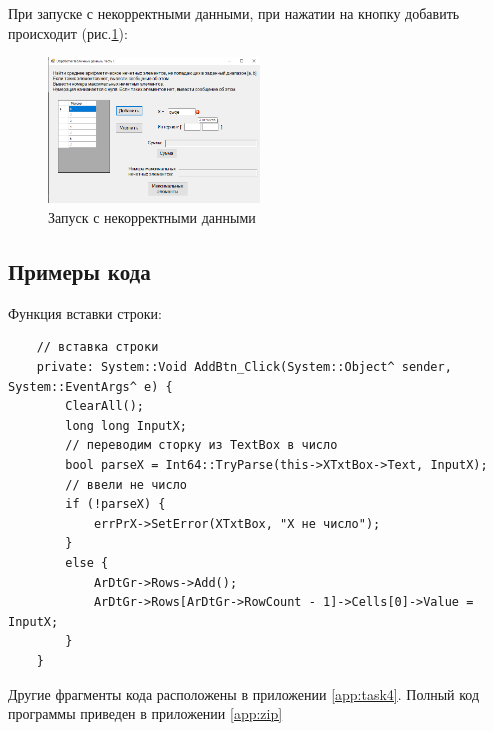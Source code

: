 При запуске с некорректными данными, при нажатии на кнопку добавить происходит  (рис.\ref{fig:BadInputNotIntForm4}):

\begin{figure}[!h]
    \centering
    \includegraphics[width = 0.5\textwidth]{images/Task4/BadInputNotIntX.png}
    \caption{Запуск с некорректными данными}
    \label{fig:BadInputNotIntForm4}
\end{figure}

\subsection{Примеры кода}

Функция вставки строки: 

\begin{verbatim}
	// вставка строки
	private: System::Void AddBtn_Click(System::Object^ sender, System::EventArgs^ e) {
		ClearAll();
		long long InputX;
		// переводим сторку из TextBox в число
		bool parseX = Int64::TryParse(this->XTxtBox->Text, InputX);
		// ввели не число
		if (!parseX) {
			errPrX->SetError(XTxtBox, "X не число");
		}
		else {
			ArDtGr->Rows->Add();
			ArDtGr->Rows[ArDtGr->RowCount - 1]->Cells[0]->Value = InputX;
		}
	}
\end{verbatim}

Другие фрагменты кода расположены в приложении \ref{app:task4}. Полный код программы приведен в приложении \ref{app:zip}
